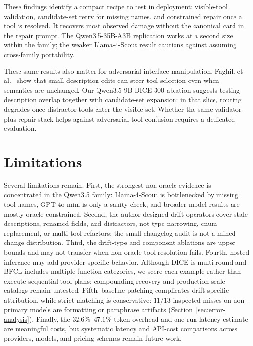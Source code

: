 \documentclass{llncs}
\begin{document}
These findings identify a compact recipe to test in deployment: visible-tool
validation, candidate-set retry for missing names, and constrained repair once a
tool is resolved. It recovers most observed damage without the canonical card in
the repair prompt. The Qwen3.5-35B-A3B replication works at a second size within
the family; the weaker Llama-4-Scout result cautions against assuming cross-family
portability.

These same results also matter for adversarial interface manipulation. Faghih
et al.~\cite{faghih2025gaming} show that small description edits can steer tool
selection even when semantics are unchanged. Our Qwen3.5-9B DICE-300 ablation
suggests testing description overlap together with candidate-set expansion: in
that slice, routing degrades once distractor tools enter the visible set. Whether
the same validator-plus-repair stack helps against adversarial tool confusion
requires a dedicated evaluation.

\section{Limitations}
\label{sec:limitations}
Several limitations remain. First, the strongest non-oracle evidence is
concentrated in the Qwen3.5 family: Llama-4-Scout is bottlenecked by missing tool
names, GPT-4o-mini is only a sanity check, and broader model results are mostly
oracle-constrained. Second, the author-designed drift operators cover stale
descriptions, renamed fields, and distractors, not type narrowing, enum replacement,
or multi-tool refactors; the small changelog audit is not a mined change
distribution. Third, the drift-type and component ablations are upper bounds and
may not transfer when non-oracle tool resolution fails. Fourth, hosted inference
may add provider-specific behavior. Although DICE is multi-round and BFCL includes
multiple-function categories, we score each example rather than execute sequential
tool plans; compounding recovery and production-scale catalogs remain untested.
Fifth, baseline patching complicates drift-specific attribution, while strict
matching is conservative: $11/13$ inspected misses on non-primary models are
formatting or paraphrase artifacts (Section~\ref{sec:error-analysis}). Finally,
the $32.6\%$--$47.1\%$ token overhead and one-run latency estimate are meaningful
costs, but systematic latency and API-cost comparisons across providers, models,
and pricing schemes remain future work.
\end{document}
